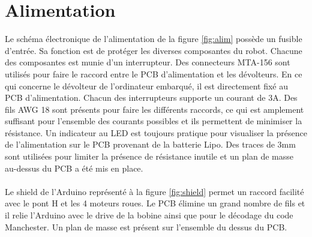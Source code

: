 \section{Alimentation}

Le schéma électronique de l'alimentation de la figure \ref{fig:alim} possède un fusible d'entrée.
Sa fonction est de protéger les diverses composantes du robot.
Chacune des composantes est munie d'un interrupteur.
Des connecteurs MTA-156 sont utilisés pour faire le raccord entre le PCB d'alimentation et les dévolteurs.
En ce qui concerne le dévolteur de l'ordinateur embarqué, il est directement fixé au PCB d'alimentation.
Chacun des interrupteurs supporte un courant de 3A.
Des fils AWG 18 sont présents pour faire les différents raccords, ce qui est amplement suffisant pour l'ensemble des courants possibles et
ils permettent de minimiser la résistance. Un indicateur au LED est toujours pratique pour visualiser la présence de l'alimentation sur le PCB
provenant de la batterie Lipo. Des traces de 3mm sont utilisées pour limiter la présence de résistance inutile
et un plan de masse au-dessus du PCB a été mis en place.

\paragraph{}
Le shield de l'Arduino représenté à la figure \ref{fig:shield} permet un raccord facilité avec le pont H et les 4 moteurs roues.
Le PCB élimine un grand nombre de fils et il relie l'Arduino avec le drive de la bobine ainsi que pour le décodage du code Manchester.
Un plan de masse est présent sur l'ensemble du dessus du PCB.



